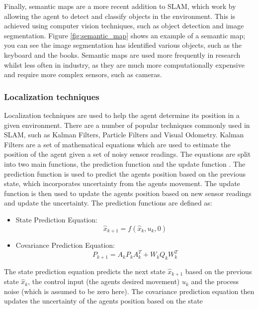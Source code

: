 \documentclass[12pt]{article}
\begin{document}
Finally, semantic maps are a more recent addition to SLAM, which work by allowing the agent to detect and classify objects in the environment.
This is achieved using computer vision techniques, such as object detection and image segmentation. Figure \ref{fig:semantic_map} shows an example
of a semantic map; you can see the image segmentation has identified various objects, such as the keyboard and the books. Semantic maps are used
more frequently in research whilst less often in industry, as they are much more computationally expensive and require more complex sensors, such as
cameras.\\

\subsubsection{Localization techniques}
Localization techniques are used to help the agent determine its position in a given environment. There are a number of popular techniques commonly
used in SLAM, such as Kalman Filters, Particle Filters and Visual Odometry. Kalman Filters are a set of mathematical equations which are used to
estimate the position of the agent given a set of noisy sensor readings. The equations are split into two main functions, the prediction function and the
update function \cite{intro_to_EKF}. The prediction function is used to predict the agents position based on the previous state, which incorporates uncertainty from the
agents movement. The update function is then used to update the agents position based on new sensor readings and update the uncertainty. The prediction functions
are defined as:
\begin{itemize}
    \item State Prediction Equation:
    \begin{equation}
        \hat{x}_{k+1} = f(\hat{x}_{k}, u_{k}, 0)
    \end{equation}
    \item Covariance Prediction Equation:
    \begin{equation}
        P_{k+1} = A_{k} P_{k} A_{k}^T + W_{k} Q_{k} W_{k}^T
    \end{equation}
\end{itemize}
The state prediction equation predicts the next state \(\hat{x}_{k+1}\) based on the previous state \(\hat{x}_{k}\), the control input (the agents desired movement) \(u_{k}\)
and the process noise (which is assumed to be zero here). The covariance prediction equation then updates the uncertainty of the agents position based on the state
\end{document}
